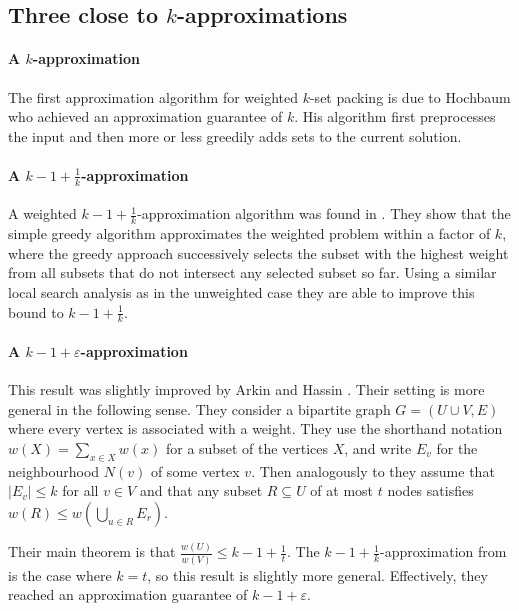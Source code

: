 \subsection{Three close to $k$-approximations}\label{subsec:Weighted1}

\paragraph{A $k$-approximation} The first approximation algorithm for weighted $k$-set packing is due to Hochbaum \cite{Hochbaum} who achieved an approximation guarantee of $k$. His algorithm first preprocesses the input and then more or less greedily adds sets to the current solution.

\paragraph{A $k - 1 + \frac{1}{k}$-approximation} A weighted $k-1+\frac{1}{k}$-approximation algorithm was found in \cite{Weighted2}. They show that the simple greedy algorithm approximates the weighted problem within a factor of $k$, where the greedy approach successively selects the subset with the highest weight from all subsets that do not intersect any selected subset so far. Using a similar local search analysis as in the unweighted case they are able to improve this bound to $k - 1 + \frac{1}{k}$.

\paragraph{A $k - 1 + \varepsilon$-approximation} This result was slightly improved by Arkin and Hassin \cite{Weighted1}. Their setting is more general in the following sense. They consider a bipartite graph $G = (U \cup V, E)$ where every vertex is associated with a weight. They use the shorthand notation $w(X) = \sum_{x \in X} w(x)$ for a subset of the vertices $X$, and write $E_v$ for the neighbourhood $N(v)$ of some vertex $v$. Then analogously to \cite{HurkensSchrijver} they assume that $|E_v| \leq k$ for all $v \in V$ and that any subset $R \subseteq U$ of at most $t$ nodes satisfies $w(R) \leq w\left( \bigcup_{u \in R} E_r \right)$.

Their main theorem is that $\frac{w(U)}{w(V)} \leq k - 1 + \frac{1}{t}$. The $k - 1 + \frac{1}{k}$-approximation from \cite{Weighted2} is the case where $k = t$, so this result is slightly more general. Effectively, they reached an approximation guarantee of $k - 1 + \varepsilon$.

